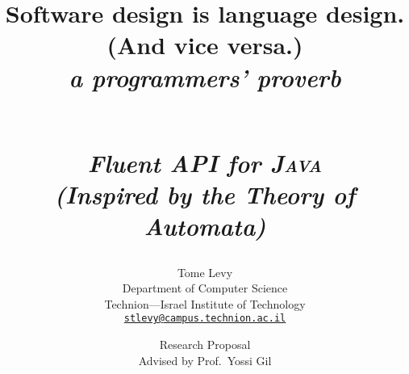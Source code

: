 \title
{%
\begin{flushright}
  \scriptsize\bfseries
  Software design is language design. \\
    (And vice versa.) \\
  \footnotesize\mdseries\itshape
   a programmers' proverb
\end{flushright}
  \Huge \SELF \\ 
  \huge \itshape \textbf Fluent \textbf API for \textsc{\textbf Java} \\
  \LARGE (\textbf Inspired by the \textbf Theory of \textbf Automata)
} 
\documentclass[10pt,twocolumn]{article}

\usepackage{\jobname}

\author{Tome Levy\\
	Department of Computer Science\\
	Technion---Israel Institute of Technology\\
	\texttt{\small \href{mailto:stlevy@campus.technion.ac.il}{stlevy@campus.technion.ac.il}}}
\date{
  Research Proposal\\
\small Advised by Prof.\ Yossi Gil
}



\maketitle

\begin{abstract}
	 
\end{abstract}

\section{Introduction}


\paragraph{Outline.} 
The remainder of this document is organized as follows.
, intended mostly to the general, non software engineering, 
  computer science audience is a brief reminder of pertinent terminology.
This terminology is then used in \cref{Section:proposal} for 
  an introductory exposition of \SELF.
The main ideas behind the bootstrapping definition of \SELF 
  are revealed in . 
 concludes. 

\section{Terminology}
\label{Section:terminology}


